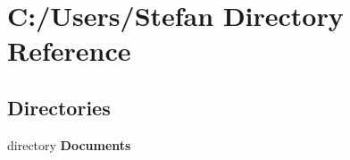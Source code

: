 \section{C\-:/\-Users/\-Stefan Directory Reference}
\label{dir_0c899e54c7ce580a91daaf8c9a785bbf}
\subsection*{Directories}
\begin{DoxyCompactItemize}
\item 
directory {\bf Documents}
\end{DoxyCompactItemize}
